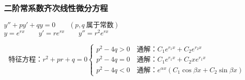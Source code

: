 \subsubsection{二阶常系数齐次线性微分方程}
\begin{center}
	$y''+py'+qy=0\qquad (p,q\ \mbox{属于常数})$\\
	$y=e^{rx}\qquad y'=re^{rx}\qquad y''=r^2e^{rx}$
\end{center}
\begin{equation}\label{Second_order_homogeneous_differential_equation_with_constant_coefficients}
	\mbox{特征方程：}r^2+pr+q=0\begin{cases}
		p^2-4q>0\quad\mbox{通解：} C_1e^{r_1x}+C_2e^{r_2x}\\
		p^2-4q=0\quad\mbox{通解：}C_1e^{r_1x}+C_2xe^{r_1x}\\
		p^2-4q<0\quad\mbox{通解：}e^{\alpha x}(C_1\cos\beta x+C_2\sin\beta x)
	\end{cases}
\end{equation}
